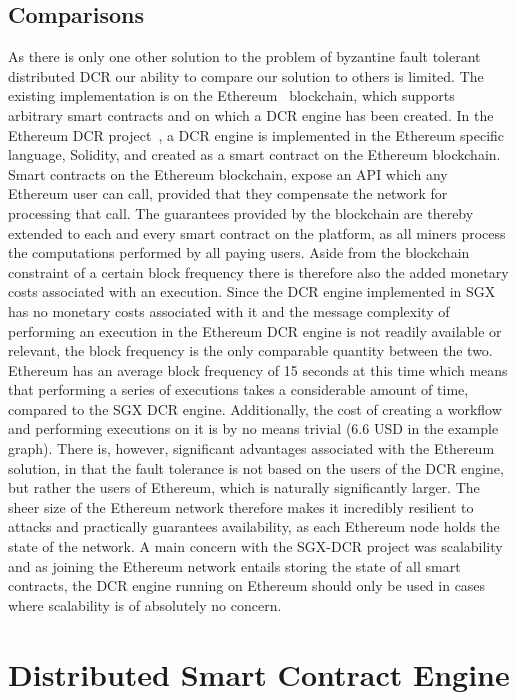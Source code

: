 \documentclass{article}
\begin{document}
    \subsection{Comparisons}
	As there is only one other solution to the problem of byzantine fault tolerant distributed DCR our ability to compare our solution to others is limited.
	The existing implementation is on the Ethereum~\cite{_ethereum_2018} blockchain, which supports arbitrary smart contracts and on which a DCR engine has been created.
	In the Ethereum DCR project~\cite{madsen_collaboration_2018}, a DCR engine is implemented in the Ethereum specific language, Solidity, and created as a smart contract on the Ethereum blockchain.
	Smart contracts on the Ethereum blockchain, expose an API which any Ethereum user can call, provided that they compensate the network for processing that call.
	The guarantees provided by the blockchain are thereby extended to each and every smart contract on the platform, as all miners process the computations performed by all paying users.
	Aside from the blockchain constraint of a certain block frequency there is therefore also the added monetary costs associated with an execution.
	Since the DCR engine implemented in SGX has no monetary costs associated with it and the message complexity of performing an execution in the Ethereum DCR engine is not readily available or relevant, the block frequency is the only comparable quantity between the two.
	Ethereum has an average block frequency of 15 seconds at this time which means that performing a series of executions takes a considerable amount of time, compared to the SGX DCR engine.
	Additionally, the cost of creating a workflow and performing executions on it is by no means trivial (6.6 USD in the example graph).
	There is, however, significant advantages associated with the Ethereum solution, in that the fault tolerance is not based on the users of the DCR engine, but rather the users of Ethereum, which is naturally significantly larger.
	The sheer size of the Ethereum network therefore makes it incredibly resilient to attacks and practically guarantees availability, as each Ethereum node holds the state of the network.
	A main concern with the SGX-DCR project was scalability and as joining the Ethereum network entails storing the state of all smart contracts, the DCR engine running on Ethereum should only be used in cases where scalability is of absolutely no concern.

	\section{Distributed Smart Contract Engine}
\end{document}
